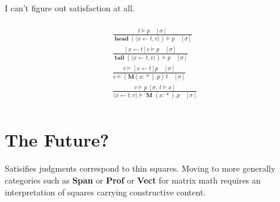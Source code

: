 \documentclass[twocolumn]{scrartcl}
\DeclareMathOperator{\prop}{*}
\DeclareMathOperator{\head}{\textbf{head}}
\DeclareMathOperator{\tail}{\textbf{tail}}
\DeclareMathOperator{\Forall}{\textbf{M}}
\DeclareMathOperator{\update}{\leftarrow}
\begin{document}
I can't figure out satisfaction at all.

\begin{multline*}
  \\
\frac{
  t \models p \quad [\sigma]
}{
  \head(\langle x \update t , v \rangle) \models p \quad [\sigma]
}\\
\frac{
  [x \update t] v \models p \quad [\sigma]
}{
  \tail(\langle x \update t , v \rangle) \models p \quad [\sigma]
}\\
\frac{
  v \models [x \update t] p \quad [\sigma]
}{
  v \models ( \textbf{M} (x \colon \prop). p) \, t \quad [\sigma]
}\\
\frac{
  v \models p \; [ \sigma , \, t \models x]
}{
  \langle x \update t , v \rangle \models \Forall (x \colon \prop). p \quad [\sigma]
}\\
\end{multline*}

\section*{The Future?}

Satisifies judgments correspond to thin squares. Moving to more
generally categories such as \textbf{Span} or \textbf{Prof} or
\textbf{Vect} for matrix math requires an interpretation of squares
carrying constructive content.
\end{document}
